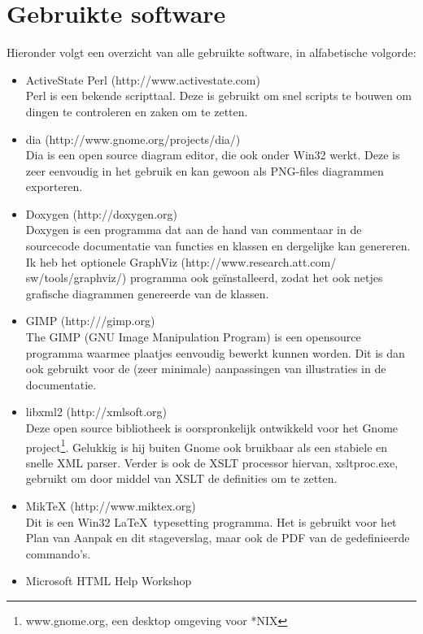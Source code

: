 \chapter{Gebruikte software}
\label{software}

Hieronder volgt een overzicht van alle gebruikte software, in alfabetische volgorde:

\begin{itemize}
\item ActiveState Perl (http://www.activestate.com) \\
Perl is een bekende scripttaal. Deze is gebruikt om snel scripts te bouwen om dingen te controleren en zaken om te zetten.
\item {}dia (http://www.gnome.org/projects/dia/) \\
Dia is een open source diagram editor, die ook onder Win32 werkt. Deze is zeer eenvoudig in het gebruik en kan gewoon als PNG-files diagrammen exporteren.
\item {}Doxygen (http://doxygen.org) \\
Doxygen is een programma dat aan de hand van commentaar in de sourcecode documentatie van functies en klassen en dergelijke kan genereren. Ik heb het optionele GraphViz (http://www.research.att.com/ sw/tools/graphviz/) programma ook ge\"installeerd, zodat het ook netjes grafische diagrammen genereerde van de klassen.
\item {}GIMP (http:///gimp.org) \\
The GIMP (GNU Image Manipulation Program) is een opensource programma waarmee plaatjes eenvoudig bewerkt kunnen worden. Dit is dan ook gebruikt voor de (zeer minimale) aanpassingen van illustraties in de documentatie.
\item libxml2 (http://xmlsoft.org) \\
Deze open source bibliotheek is oorspronkelijk ontwikkeld voor het Gnome project\footnote{www.gnome.org, een desktop omgeving voor *NIX}. Gelukkig is hij buiten Gnome ook bruikbaar als een stabiele en snelle XML parser. Verder is ook de XSLT processor hiervan, xsltproc.exe, gebruikt om door middel van XSLT de definities om te zetten.
\item {}MikTeX (http://www.miktex.org) \\
Dit is een Win32 \LaTeX \mbox{ }typesetting programma. Het is gebruikt voor het Plan van Aanpak en dit stageverslag, maar ook de PDF van de gedefinieerde commando's.
\item Microsoft HTML Help Workshop \\

\end{itemize}
